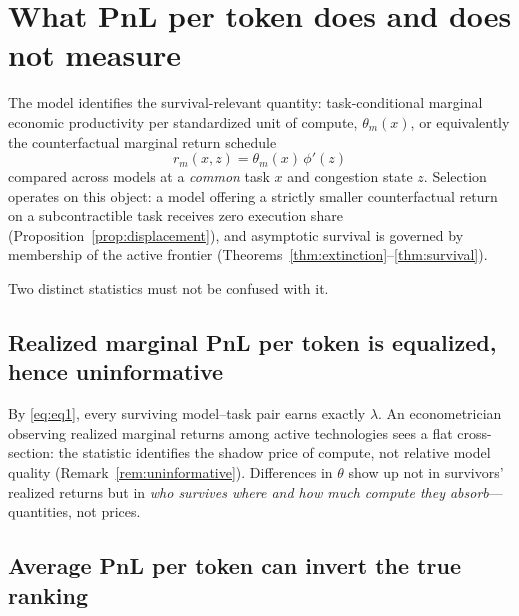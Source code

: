 \documentclass[11pt]{article}
\theoremstyle{definition}
\theoremstyle{remark}
\begin{document}
\section{What PnL per token does and does not measure}
\label{sec:measure}

The model identifies the survival-relevant quantity: task-conditional marginal economic productivity per standardized unit of compute, $\theta_m(x)$, or equivalently the counterfactual marginal return schedule
\begin{equation}
r_{m}(x, z) = \theta_m(x)\, \phi'(z)
\end{equation}
compared across models at a \emph{common} task $x$ and congestion state $z$. Selection operates on this object: a model offering a strictly smaller counterfactual return on a subcontractible task receives zero execution share (Proposition~\ref{prop:displacement}), and asymptotic survival is governed by membership of the active frontier (Theorems~\ref{thm:extinction}--\ref{thm:survival}).

Two distinct statistics must not be confused with it.

\subsection{Realized marginal PnL per token is equalized, hence uninformative}

By \eqref{eq:eq1}, every surviving model--task pair earns exactly $\lambda$. An econometrician observing realized marginal returns among active technologies sees a flat cross-section: the statistic identifies the shadow price of compute, not relative model quality (Remark~\ref{rem:uninformative}). Differences in $\theta$ show up not in survivors' realized returns but in \emph{who survives where and how much compute they absorb}---quantities, not prices.

\subsection{Average PnL per token can invert the true ranking}
\end{document}
